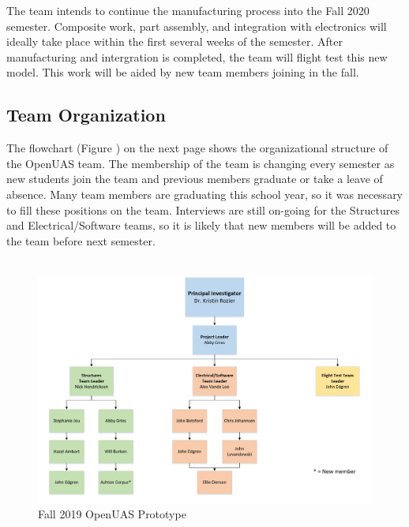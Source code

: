 \documentclass{article}
\begin{document}
The team intends to continue the manufacturing process into the Fall 2020 semester. Composite work, part assembly, and integration with electronics will ideally take place within the first several weeks of the semester. After manufacturing and intergration is completed, the team will flight test this new model.  This work will be aided by new team members joining in the fall.

\subsection{Team Organization}
The flowchart (Figure ) on the next page shows the organizational structure of the OpenUAS team. The membership of the team is changing every semester as new students join the team and previous members graduate or take a leave of absence. Many team members are graduating this school year, so it was necessary to fill these positions on the team. Interviews are still on-going for the Structures and Electrical/Software teams, so it is likely that new members will be added to the team before next semester.\\\\

\newpage

\begin{landscape}
\begin{figure}[hbt!]
\centering
\includegraphics[scale=0.75]{TeamOrganization_Spring2020.png}
\caption{Fall 2019 OpenUAS Prototype}
\label{fig:2019_model}
\end{figure}
\end{landscape}

\newpage
\end{document}
